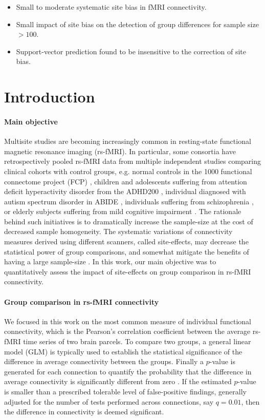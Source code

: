 \documentclass[authoryear]{elsarticle}
\begin{document}
\begin{itemize}
\item Small to moderate systematic site bias in fMRI connectivity.
\item Small impact of site bias on the detection of group differences for sample size $>100$. 
\item Support-vector prediction found to be insensitive to the correction of site bias.
\end{itemize}

\section{Introduction}

\paragraph{Main objective}
Multisite studies are becoming increasingly common in resting-state functional magnetic resonance imaging (rs-fMRI). In particular, some consortia have retrospectively pooled rs-fMRI data from multiple independent studies comparing clinical cohorts with control groups, e.g. normal controls in the 1000 functional connectome project (FCP) \citep{Biswal2010}, children and adolescents suffering from attention deficit hyperactivity disorder from the ADHD200 \citep{ADHD200,Fair2012}, individual diagnosed with autism spectrum disorder in ABIDE \citep{Nielsen2013}, individuals suffering from schizophrenia \citep{Cheng2015}, or elderly subjects suffering from mild cognitive impairment \citep{Tam2015}. The rationale behind such initiatives is to dramatically increase the sample-size at the cost of decreased sample homogeneity. The systematic variations of connectivity measures derived using different scanners, called site-effects, may decrease the statistical power of group comparisons, and somewhat mitigate the benefits of having a large sample-size \cite{Brown2011,Jovicich2016}. In this work, our main objective was to quantitatively assess the impact of site-effects on group comparison in rs-fMRI connectivity.

\paragraph{Group comparison in rs-fMRI connectivity}
We focused in this work on the most common measure of individual functional connectivity, which is the Pearson's correlation coefficient between the average rs-fMRI time series of two brain parcels. To compare two groups, a general linear model (GLM) is typically used to establish the statistical significance of the difference in average connectivity between the groups. Finally a $p$-value is generated for each connection to quantify the probability that the difference in average connectivity is significantly different from zero \citep{Worsley1995}. If the estimated $p$-value is smaller than a prescribed tolerable level of false-positive findings, generally adjusted for the number of tests performed across connections, say $q=0.01$, then the difference in connectivity is deemed significant. 
\end{document}
